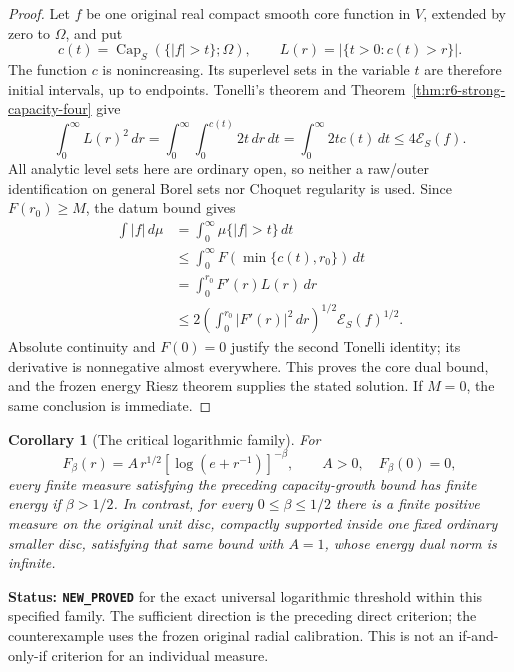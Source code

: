\documentclass[11pt,a4paper]{article}
\numberwithin{equation}{section}
\newtheorem{corollary}[theorem]{Corollary}
\theoremstyle{definition}
\theoremstyle{remark}
\begin{document}
\begin{proof}
Let $f$ be one original real compact smooth core function in $V$,
extended by zero to $\Omega$, and put
\[
 c(t)=\operatorname{Cap}_S(\{|f|>t\};\Omega),\qquad
 L(r)=\big|\{t>0:c(t)>r\}\big|.
\]
The function $c$ is nonincreasing. Its superlevel sets in the variable
$t$ are therefore initial intervals, up to endpoints. Tonelli's
theorem and Theorem~\ref{thm:r6-strong-capacity-four} give
\[
 \int_0^\infty L(r)^2\,dr
    =\int_0^\infty\int_0^{c(t)}2t\,dr\,dt
    =\int_0^\infty2t c(t)\,dt\le4\mathcal E_S(f).
\]
All analytic level sets here are ordinary open, so neither a raw/outer
identification on general Borel sets nor Choquet regularity is used.
Since $F(r_0)\ge M$, the datum bound gives
\[
 \begin{split}
 \int|f|\,d\mu
  &=\int_0^\infty\mu\{|f|>t\}\,dt\\
  &\le\int_0^\infty F(\min\{c(t),r_0\})\,dt\\
  &=\int_0^{r_0}F'(r)L(r)\,dr\\
  &\le2\left(\int_0^{r_0}|F'(r)|^2\,dr\right)^{1/2}
                                 \mathcal E_S(f)^{1/2}.
 \end{split}
\]
Absolute continuity and $F(0)=0$ justify the second Tonelli identity;
its derivative is nonnegative almost everywhere. This proves the
core dual bound, and the frozen energy Riesz theorem supplies the
stated solution. If $M=0$, the same conclusion is immediate.
\end{proof}

\begin{corollary}[The critical logarithmic family]
\label{cor:r6-critical-log-energy-modulus}
For
\[
       F_\beta(r)=A\,r^{1/2}
                         [\log(e+r^{-1})]^{-\beta},\qquad A>0,
       \quad F_\beta(0)=0,
\]
every finite measure satisfying the preceding capacity-growth bound
has finite energy if $\beta>1/2$. In contrast, for every
$0\le\beta\le1/2$ there is a finite positive measure on the original
unit disc, compactly supported inside one fixed ordinary smaller
disc, satisfying that same bound with $A=1$, whose energy dual norm
is infinite.
\end{corollary}

\noindent\textbf{Status: \texttt{NEW\_PROVED}} for the exact universal
logarithmic threshold within this specified family. The sufficient
direction is the preceding direct criterion; the counterexample uses
the frozen original radial calibration. This is not an if-and-only-if
criterion for an individual measure.
\end{document}
